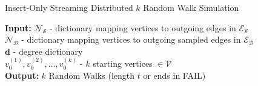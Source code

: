 \documentclass[10]{report}
\newcommand{\algoname}[1]{\textnormal{\textsc{#1}}}
\begin{document}
\begin{algorithm}[htbp] 
\caption{Insert-Only Streaming Distributed $k$ Random Walk Simulation}\label{alg:rw:distributed:insert-only:simulation}
\begin{flushleft}
        \textbf{Input:} 		$\mathcal{N}_\mathcal{S}$ - dictionary mapping vertices to outgoing edges in $\mathcal{E}_\mathcal{S}$ \\
        	\hspace{3.15em}	$\mathcal{N}_\mathcal{B}$ - dictionary mapping vertices to outgoing sampled edges in $\mathcal{E}_\mathcal{B}$ \\
        	\hspace{3.15em}	$\mathbf{d}$ - degree dictionary \\
        	\hspace{3.15em}	$v_0^{(1)}, v_0^{(2)}, \dots, v_0^{(k)}$ - $k$ starting vertices $\in \mathcal{V}$ \\
        \textbf{Output:} $k$ Random Walks (length $t$ or ends in FAIL)
\end{flushleft}
\begin{flushleft}
\begin{algorithmic}[1]

\end{algorithmic}
\end{flushleft}
\end{algorithm}
\end{document}
